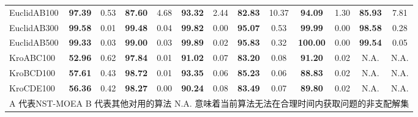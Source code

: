 {\begin{longtable}[c]{lcccccccccccc}
    EuclidAB100                   & \textbf{97.39}                & 0.53                           & \textbf{87.60}                 & 4.68                     & \textbf{93.32}              & 2.44                      & \textbf{82.83}           & 10.37  & \textbf{94.09}  & 1.30   & \textbf{85.93}  & 7.81  \\
    EuclidAB300                   & \textbf{99.58}                & 0.01                           & \textbf{99.48}                 & 0.04                     & \textbf{99.82}              & 0.00                      & \textbf{95.07}           & 0.53   & \textbf{99.99}  & 0.00   & \textbf{98.58}  & 0.28  \\
    EuclidAB500                   & \textbf{99.33}                & 0.03                           & \textbf{99.00}                 & 0.03                     & \textbf{99.89}              & 0.02                      & \textbf{95.83}           & 0.32   & \textbf{100.00} & 0.00   & \textbf{99.54}  & 0.05  \\

    KroABC100                     & \textbf{52.96}                & 0.62                           & \textbf{97.84}                 & 0.01                     & \textbf{91.02}              & 0.07                      & \textbf{83.20}           & 0.08   & \textbf{91.20}  & 0.02   & N.A.            & N.A.  \\
    KroBCD100                     & \textbf{57.61}                & 0.43                           & \textbf{98.72}                 & 0.01                     & \textbf{93.35}              & 0.06                      & \textbf{85.23}           & 0.06   & \textbf{88.83}  & 0.02   & N.A.            & N.A.  \\
    KroCDE100                     & \textbf{56.36}                & 0.42                           & \textbf{98.27}                 & 0.00                     & \textbf{90.24}              & 0.08                      & \textbf{83.49}           & 0.07   & \textbf{89.80}  & 0.02   & N.A.            & N.A.  \\
    \bottomrule
    \multicolumn{13}{p{45em}}{
        A 代表NST-MOEA\vspace{-.75em}\newline{}
        B 代表其他对用的算法\vspace{-.75em}\newline{}
        N.A. 意味着当前算法无法在合理时间内获取问题的非支配解集
    }
\end{longtable}
}


